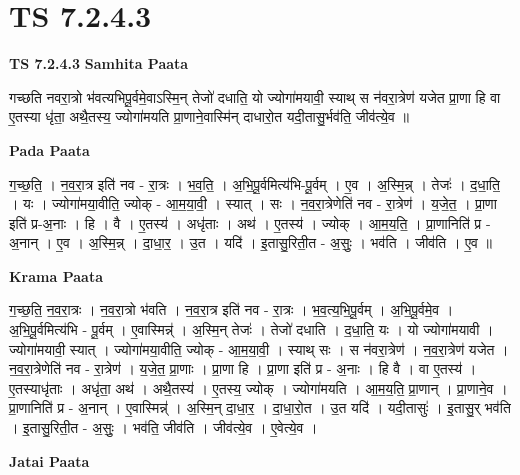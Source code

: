 \documentclass[17pt]{extarticle}
\begin{document}
\section{ TS 7.2.4.3 }

\textbf{TS 7.2.4.3 } \newline
\textbf{Samhita Paata} \newline

गच्छति नवरा॒त्रो भ॑वत्यभिपू॒र्वमे॒वाऽस्मि॒न् तेजो॑ दधाति॒ यो ज्योगा॑मयावी॒ स्याथ् स न॑वरा॒त्रेण॑ यजेत प्रा॒णा हि वा ए॒तस्या धृ॑ता॒ अथै॒तस्य॒ ज्योगा॑मयति प्रा॒णाने॒वास्मि॑न् दाधारो॒त यदी॒तासु॒र्भव॑ति॒ जीव॑त्ये॒व ॥ \newline

\textbf{Pada Paata} \newline

ग॒च्छ॒ति॒ । न॒व॒रा॒त्र इति॑ नव - रा॒त्रः । भ॒व॒ति॒ । अ॒भि॒पू॒र्वमित्य॑भि-पू॒र्वम् । ए॒व । अ॒स्मि॒न्न् । तेजः॑ । द॒धा॒ति॒ । यः । ज्योगा॑मया॒वीति॒ ज्योक् - आ॒म॒या॒वी॒ । स्यात् । सः । न॒व॒रा॒त्रेणेति॑ नव - रा॒त्रेण॑ । य॒जे॒त॒ । प्रा॒णा इति॑ प्र-अ॒नाः । हि । वै । ए॒तस्य॑ । अधृ॑ताः । अथ॑ । ए॒तस्य॑ । ज्योक् । आ॒म॒य॒ति॒ । प्रा॒णानिति॑ प्र - अ॒नान् । ए॒व । अ॒स्मि॒न्न् । दा॒धा॒र॒ । उ॒त । यदि॑ । इ॒तासु॒रिती॒त - अ॒सुः॒ । भव॑ति । जीव॑ति । ए॒व ॥  \newline


\textbf{Krama Paata} \newline

ग॒च्छ॒ति॒ न॒व॒रा॒त्रः । न॒व॒रा॒त्रो भ॑वति । न॒व॒रा॒त्र इति॑ नव - रा॒त्रः । भ॒व॒त्य॒भि॒पू॒र्वम् । अ॒भि॒पू॒र्वमे॒व । अ॒भि॒पू॒र्वमित्य॑भि - पू॒र्वम् । ए॒वास्मिन्न्॑ । अ॒स्मि॒न् तेजः॑ । तेजो॑ दधाति । द॒धा॒ति॒ यः । यो ज्योगा॑मयावी । ज्योगा॑मयावी॒ स्यात् । ज्योगा॑मया॒वीति॒ ज्योक् - आ॒म॒या॒वी॒ । स्याथ् सः । स न॑वरा॒त्रेण॑ । न॒व॒रा॒त्रेण॑ यजेत । न॒व॒रा॒त्रेणेति॑ नव - रा॒त्रेण॑ । य॒जे॒त॒ प्रा॒णाः । प्रा॒णा हि । प्रा॒णा इति॑ प्र - अ॒नाः । हि वै । वा ए॒तस्य॑ । ए॒तस्याधृ॑ताः । अधृ॑ता॒ अथ॑ । अथै॒तस्य॑ । ए॒तस्य॒ ज्योक् । ज्योगा॑मयति । आ॒म॒य॒ति॒ प्रा॒णान् । प्रा॒णाने॒व । प्रा॒णानिति॑ प्र - अ॒नान् । ए॒वास्मिन्न्॑ । अ॒स्मि॒न् दा॒धा॒र॒ । दा॒धा॒रो॒त । उ॒त यदि॑ । यदी॒तासुः॑ । इ॒तासु॒र् भव॑ति । इ॒तासु॒रिती॒त - अ॒सुः॒ । भव॑ति॒ जीव॑ति । जीव॑त्ये॒व । ए॒वेत्ये॒व । \newline

\textbf{Jatai Paata} \newline
\end{document}
